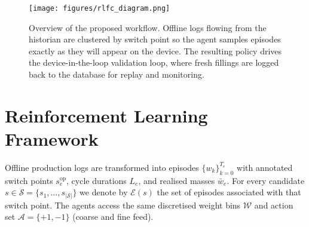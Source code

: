 \documentclass[journal]{IEEEtranTIE}
\begin{document}
\begin{figure*}[t]
  \centering
  \texttt{[image: figures/rlfc\_diagram.png]}
  \caption{Overview of the proposed workflow. Offline logs flowing from the historian are clustered by switch point so the agent samples episodes exactly as they will appear on the device. The resulting policy drives the device-in-the-loop validation loop, where fresh fillings are logged back to the database for replay and monitoring.}
  \label{fig:pipeline}
\end{figure*}

\section{Reinforcement Learning Framework}
\label{sec:rl-framework}
Offline production logs are transformed into episodes $\{w_k\}_{k=0}^{T_e}$ with annotated switch points $s^{\text{op}}_e$, cycle durations $L_e$, and realised masses $\bar{w}_e$. For every candidate $s\in\mathcal{S}=\{s_1,\dots,s_{|\mathcal{S}|}\}$ we denote by $\mathcal{E}(s)$ the set of episodes associated with that switch point. The agents access the same discretised weight bins $\mathcal{W}$ and action set $\mathcal{A}=\{+1,-1\}$ (coarse and fine feed).
\end{document}
